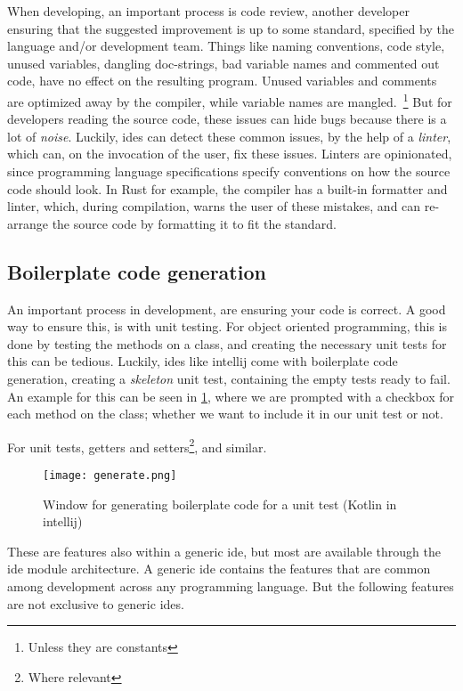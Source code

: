When developing, an important process is code review, another developer ensuring
that the suggested improvement is up to some standard, specified by the
language and/or development team. Things like naming conventions, code style,
unused variables, dangling doc-strings, bad variable names and commented out
code, have no effect on the resulting program. Unused variables and comments
are optimized away by the compiler, while variable names are mangled.~\footnote{Unless they are constants}
But for developers reading the source code, these issues can hide bugs because
there is a lot of \textit{noise}. Luckily, \gls*{ide}s can detect these common
issues, by the help of a \textit{linter}, which can, on the invocation of the
user, fix these issues. Linters are opinionated, since programming language
specifications specify conventions on how the source code should look. In Rust
for example, the compiler has a built-in formatter and linter, which, during
compilation, warns the user of these mistakes, and can re-arrange the source
code by formatting it to fit the standard.

\subsection{Boilerplate code generation}

An important process in development, are ensuring your code is correct. A good
way to ensure this, is with unit testing. For object oriented programming, this
is done by testing the methods on a class, and creating the necessary unit tests
for this can be tedious. Luckily, \gls*{ide}s like \gls*{intellij} come with
boilerplate code generation, creating a \textit{skeleton} unit test, containing
the empty tests ready to fail. An example for this can be seen in
\ref{pic:generate}, where we are prompted with a checkbox for each method on
the class; whether we want to include it in our unit test or not.

For unit tests, getters and setters\footnote{Where relevant}, and similar.

\begin{figure}
  \centering
  \texttt{[image: generate.png]}
  \caption{
    Window for generating boilerplate code for a unit test (Kotlin in
    \gls*{intellij})
  }
  \label{pic:generate}
\end{figure}

These are features also within a generic \gls*{ide}, but most are available
through the \gls*{ide} module architecture. A generic \gls*{ide} contains the
features that are common among development across any programming language. But
the following features are not exclusive to generic \gls*{ide}s.

